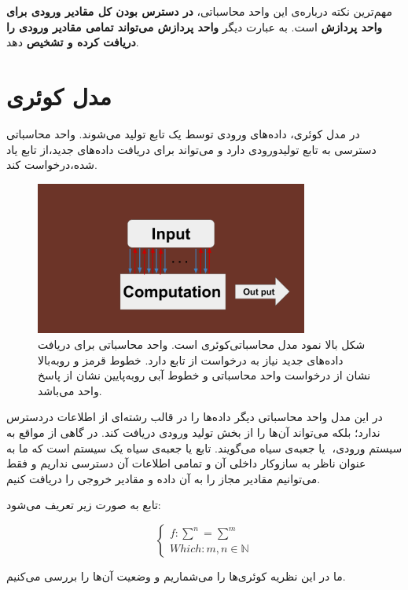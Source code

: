\documentclass{book}
\begin{document}
مهم‌ترین نکته درباره‌ی این واحد محاسباتی،‌ \textbf{در دسترس بودن کل مقادیر ورودی برای واحد پردازش} است. به عبارت دیگر\textbf{ واحد پردازش می‌تواند تمامی مقادیر ورودی را دریافت کرده و تشخیص} دهد. 

\section{مدل کوئری}
در مدل کوئری، داده‌های ورودی توسط یک تابع تولید می‌شوند. واحد محاسباتی دسترسی به تابع تولیدورودی دارد و می‌تواند برای دریافت داده‌های جدید،‌از تابع یاد شده،‌درخواست کند.

\begin{figure}[ht]
	\centering
	\includegraphics[width=0.8\textwidth]{Query computation model.png}
	\caption{شکل بالا نمود مدل محاسباتی‌کوئری است. واحد محاسباتی برای دریافت داده‌های جدید نیاز به درخواست از تابع  دارد. خطوط قرمز و روبه‌بالا نشان از درخواست واحد محاسباتی و خطوط آبی روبه‌پایین نشان از پاسخ واحد می‌باشد.}
\end{figure}


در این مدل واحد محاسباتی دیگر داده‌ها را در قالب رشته‌ای از اطلاعات دردسترس ندارد؛ بلکه می‌تواند آن‌ها را از بخش تولید ورودی دریافت کند. در گاهی از مواقع به سیستم ورودی، ‌ یا جعبه‌ی سیاه می‌گویند. تابع  یا جعبه‌ی سیاه یک سیستم است که ما به عنوان ناظر به سازوکار داخلی آن و  تمامی اطلاعات آن دسترسی نداریم و فقط می‌توانیم مقادیر مجاز را به آن داده و مقادیر خروجی را دریافت کنیم. 

تابع  به صورت زیر تعریف می‌شود:
\begin{center}
$$
\left\{
\begin{array}{ll}
f : \sum^n = \sum^m\\
Which : m, n \in \mathbb{N}
\end{array}
\right.
$$
\end{center}

ما در این نظریه کوئری‌ها را می‌شماریم و وضعیت آن‌‌ها را بررسی می‌کنیم.
\end{document}
